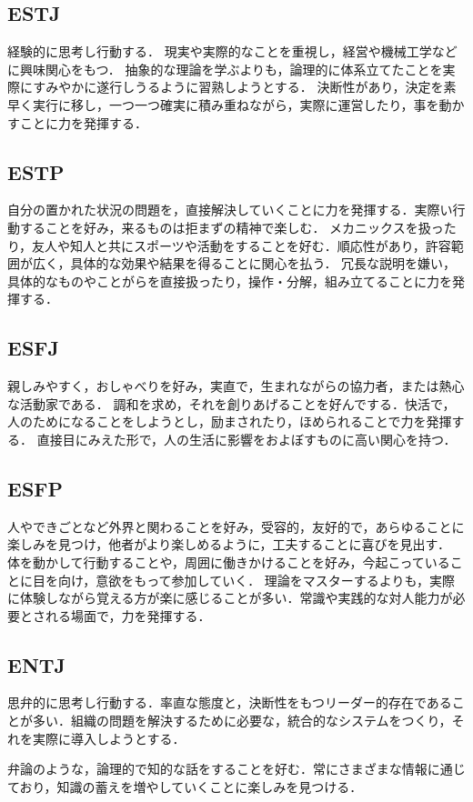 \subsection{ESTJ}
経験的に思考し行動する．
現実や実際的なことを重視し，経営や機械工学などに興味関心をもつ．
抽象的な理論を学ぶよりも，論理的に体系立てたことを実際にすみやかに遂行しうるように習熟しようとする．
決断性があり，決定を素早く実行に移し，一つ一つ確実に積み重ねながら，実際に運営したり，事を動かすことに力を発揮する．
\subsection{ESTP}
自分の置かれた状況の問題を，直接解決していくことに力を発揮する．実際い行動することを好み，来るものは拒まずの精神で楽しむ．
メカニックスを扱ったり，友人や知人と共にスポーツや活動をすることを好む．順応性があり，許容範囲が広く，具体的な効果や結果を得ることに関心を払う．
冗長な説明を嫌い，具体的なものやことがらを直接扱ったり，操作・分解，組み立てることに力を発揮する．
\subsection{ESFJ}
親しみやすく，おしゃべりを好み，実直で，生まれながらの協力者，または熱心な活動家である．
調和を求め，それを創りあげることを好んでする．快活で，人のためになることをしようとし，励まされたり，ほめられることで力を発揮する．
直接目にみえた形で，人の生活に影響をおよぼすものに高い関心を持つ．
\subsection{ESFP}
人やできごとなど外界と関わることを好み，受容的，友好的で，あらゆることに楽しみを見つけ，他者がより楽しめるように，工夫することに喜びを見出す．
体を動かして行動することや，周囲に働きかけることを好み，今起こっていることに目を向け，意欲をもって参加していく．
理論をマスターするよりも，実際に体験しながら覚える方が楽に感じることが多い．常識や実践的な対人能力が必要とされる場面で，力を発揮する．
\newpage

\subsection{ENTJ}

思弁的に思考し行動する．率直な態度と，決断性をもつリーダー的存在であることが多い．組織の問題を解決するために必要な，統合的なシステムをつくり，それを実際に導入しようとする．

弁論のような，論理的で知的な話をすることを好む．常にさまざまな情報に通じており，知識の蓄えを増やしていくことに楽しみを見つける．
